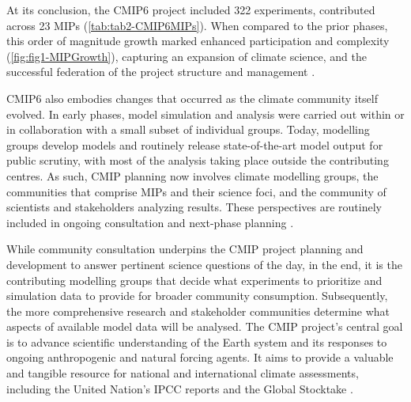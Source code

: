 \documentclass[gmd, preprint]{copernicus}
\begin{document}
At its conclusion, the CMIP6 project included 322 experiments, contributed across 23 MIPs (\autoref{tab:tab2-CMIP6MIPs}). When compared to the prior phases, this order of magnitude growth marked enhanced participation and complexity (\autoref{fig:fig1-MIPGrowth}), capturing an expansion of climate science, and the successful federation of the project structure and management \citep{eyring_overview_2016}.

CMIP6 also embodies changes that occurred as the climate community itself evolved. In early phases, model simulation and analysis were carried out within or in collaboration with a small subset of individual groups. Today, modelling groups develop models and routinely release state-of-the-art model output for public scrutiny, with most of the analysis taking place outside the contributing centres. As such, CMIP planning now involves climate modelling groups, the communities that comprise MIPs and their science foci, and the community of scientists and stakeholders analyzing results. These perspectives are routinely included in ongoing consultation and next-phase planning \citep{stouffer_cmip5_2017}.

While community consultation underpins the CMIP project planning and development to answer pertinent science questions of the day, in the end, it is the contributing modelling groups that decide what experiments to prioritize and simulation data to provide for broader community consumption. Subsequently, the more comprehensive research and stakeholder communities determine what aspects of available model data will be analysed. The CMIP project's central goal is to advance scientific understanding of the Earth system and its responses to ongoing anthropogenic and natural forcing agents. It aims to provide a valuable and tangible resource for national and international climate assessments, including the United Nation's IPCC reports and the Global Stocktake \citep{stouffer_cmip5_2017}.


\end{document}
